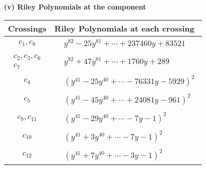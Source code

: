 \documentclass[1p]{elsarticle_modified}
\theoremstyle{definition}
\begin{document}
\newpage\renewcommand{\arraystretch}{1}
\flushleft \textbf{(v) Riley Polynomials at the component}\newline \\
\begin{tabular}{m{50pt}|m{274pt}}
Crossings & \hspace{64pt}Riley Polynomials at each crossing \\
\hline $$\begin{aligned}c_{1},c_{8}\end{aligned}$$&$\begin{aligned}
&y^{82}-25 y^{81}+\cdots+237460 y+83521
\end{aligned}$\\
\hline $$\begin{aligned}c_{2},c_{3},c_{6}\\c_{7}\end{aligned}$$&$\begin{aligned}
&y^{82}+47 y^{81}+\cdots+1760 y+289
\end{aligned}$\\
\hline $$\begin{aligned}c_{4}\end{aligned}$$&$\begin{aligned}
&(y^{41}-25 y^{40}+\cdots-76331 y-5929)^{2}
\end{aligned}$\\
\hline $$\begin{aligned}c_{5}\end{aligned}$$&$\begin{aligned}
&(y^{41}-45 y^{40}+\cdots+24081 y-961)^{2}
\end{aligned}$\\
\hline $$\begin{aligned}c_{9},c_{11}\end{aligned}$$&$\begin{aligned}
&(y^{41}-29 y^{40}+\cdots-7 y-1)^{2}
\end{aligned}$\\
\hline $$\begin{aligned}c_{10}\end{aligned}$$&$\begin{aligned}
&(y^{41}+3 y^{40}+\cdots-7 y-1)^{2}
\end{aligned}$\\
\hline $$\begin{aligned}c_{12}\end{aligned}$$&$\begin{aligned}
&(y^{41}+7 y^{40}+\cdots-3 y-1)^{2}
\end{aligned}$\\
\hline
\end{tabular}\\~\\
\end{document}
